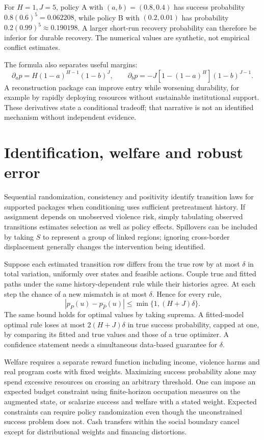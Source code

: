 \documentclass[11pt]{article}
\begin{document}
For $H=1,J=5$, policy A with $(a,b)=(0.8,0.4)$ has success probability $0.8(0.6)^5=0.062208$, while policy B with $(0.2,0.01)$ has probability $0.2(0.99)^5\approx0.190198$. A larger short-run recovery probability can therefore be inferior for durable recovery. The numerical values are synthetic, not empirical conflict estimates.

The formula also separates useful margins:
\[
 \partial_a p=H(1-a)^{H-1}(1-b)^J,\qquad
 \partial_b p=-J[1-(1-a)^H](1-b)^{J-1}.
\]
A reconstruction package can improve entry while worsening durability, for example by rapidly deploying resources without sustainable institutional support. These derivatives state a conditional tradeoff; that narrative is not an identified mechanism without independent evidence.

\section*{Identification, welfare and robust error}
Sequential randomization, consistency and positivity identify transition laws for supported packages when conditioning uses sufficient pretreatment history. If assignment depends on unobserved violence risk, simply tabulating observed transitions estimates selection as well as policy effects. Spillovers can be included by taking $S$ to represent a group of linked regions; ignoring cross-border displacement generally changes the intervention being identified.

Suppose each estimated transition row differs from the true row by at most $\delta$ in total variation, uniformly over states and feasible actions. Couple true and fitted paths under the same history-dependent rule while their histories agree. At each step the chance of a new mismatch is at most $\delta$. Hence for every rule,
\[
 |p_P(u)-p_{\widehat P}(u)|\leq \min\{1,(H+J)\delta\}.
\]
The same bound holds for optimal values by taking suprema. A fitted-model optimal rule loses at most $2(H+J)\delta$ in true success probability, capped at one, by comparing its fitted and true values and those of a true optimizer. A confidence statement needs a simultaneous data-based guarantee for $\delta$.

Welfare requires a separate reward function including income, violence harms and real program costs with fixed weights. Maximizing success probability alone may spend excessive resources on crossing an arbitrary threshold. One can impose an expected budget constraint using finite-horizon occupation measures on the augmented state, or scalarize success and welfare with a stated weight. Expected constraints can require policy randomization even though the unconstrained success problem does not. Cash transfers within the social boundary cancel except for distributional weights and financing distortions.
\end{document}
